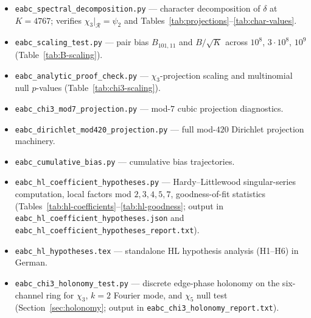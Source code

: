 \documentclass[11pt,a4paper]{article}
\newcommand{\R}{\mathcal{R}}
\begin{document}
\begin{itemize}
  \item \texttt{eabc\_spectral\_decomposition.py} --- character decomposition
        of $\delta$ at $K=4767$; verifies $\chi_3|_{\R}=\psi_2$ and
        Tables~\ref{tab:projections}--\ref{tab:char-values}.
  \item \texttt{eabc\_scaling\_test.py} --- pair bias $B_{101,11}$ and
        $B/\sqrt{K}$ across $10^8$, $3\cdot 10^8$, $10^9$
        (Table~\ref{tab:B-scaling}).
  \item \texttt{eabc\_analytic\_proof\_check.py} --- $\chi_3$-projection
        scaling and multinomial null $p$-values (Table~\ref{tab:chi3-scaling}).
  \item \texttt{eabc\_chi3\_mod7\_projection.py} --- mod-$7$ cubic projection
        diagnostics.
  \item \texttt{eabc\_dirichlet\_mod420\_projection.py} --- full mod-$420$
        Dirichlet projection machinery.
  \item \texttt{eabc\_cumulative\_bias.py} --- cumulative bias trajectories.
  \item \texttt{eabc\_hl\_coefficient\_hypotheses.py} --- Hardy--Littlewood
        singular-series computation, local factors mod $2,3,4,5,7$,
        goodness-of-fit statistics (Tables~\ref{tab:hl-coefficients}--\ref{tab:hl-goodness};
        output in \texttt{eabc\_hl\_coefficient\_hypotheses.json} and
        \texttt{eabc\_hl\_coefficient\_hypotheses\_report.txt}).
  \item \texttt{eabc\_hl\_hypotheses.tex} --- standalone HL hypothesis
        analysis (H1--H6) in German.
  \item \texttt{eabc\_chi3\_holonomy\_test.py} --- discrete edge-phase
        holonomy on the six-channel ring for $\chi_3$, $k{=}2$ Fourier mode,
        and $\chi_5$ null test (Section~\ref{sec:holonomy};
        output in \texttt{eabc\_chi3\_holonomy\_report.txt}).
\end{itemize}
\end{document}
